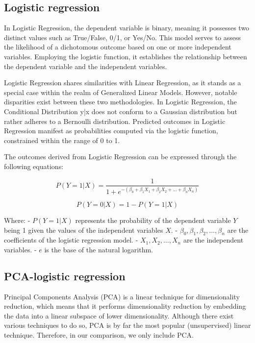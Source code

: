 \documentclass[a4paper,10pt,twocolumn]{article}
\begin{document}
\subsection{Logistic regression}

In Logistic Regression, the dependent variable is binary, meaning it possesses two distinct values such as True/False, 0/1, or Yes/No. This model serves to assess the likelihood of a dichotomous outcome based on one or more independent variables. Employing the logistic function, it establishes the relationship between the dependent variable and the independent variables.

Logistic Regression shares similarities with Linear Regression, as it stands as a special case within the realm of Generalized Linear Models. However, notable disparities exist between these two methodologies. In Logistic Regression, the Conditional Distribution y|x does not conform to a Gaussian distribution but rather adheres to a Bernoulli distribution.
Predicted outcomes in Logistic Regression manifest as probabilities computed via the logistic function, constrained within the range of 0 to 1.

The outcomes derived from Logistic Regression can be expressed through the following equations:

\[
P(Y=1|X) = \frac{1}{1 + e^{-(\beta_0 + \beta_1 X_1 + \beta_2 X_2 + \ldots + \beta_n X_n)}}
\]

\[
P(Y=0|X) = 1 - P(Y=1|X)
\]

Where:
- \( P(Y=1|X) \) represents the probability of the dependent variable \( Y \) being 1 given the values of the independent variables \( X \).
- \( \beta_0, \beta_1, \beta_2, \ldots, \beta_n \) are the coefficients of the logistic regression model.
- \( X_1, X_2, \ldots, X_n \) are the independent variables.
- \( e \) is the base of the natural logarithm. \cite{alma991003312373606666}

\subsection{PCA-logistic regression}

Principal Components Analysis (PCA) is a linear technique for dimensionality reduction, which means that it performs dimensionality reduction by embedding the data into a linear subspace of lower dimensionality. Although there exist various techniques to do so, PCA is by far the most popular (unsupervised) linear technique. Therefore, in our comparison, we only include PCA.
\end{document}
